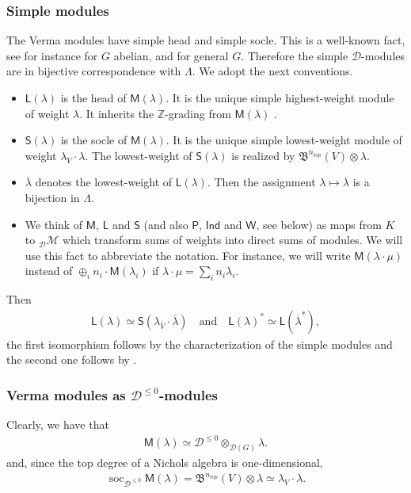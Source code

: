 \documentclass[reqno]{amsart}
\newcommand{\cM}{\mathcal{M}}
\newcommand{\oV}{\overline{V}}
\renewcommand{\_}[1]{_{\left( #1 \right)}}
\renewcommand{\^}[1]{^{\left( #1 \right)}}
\newcommand{\ot}{{\otimes}}
\newcommand\fInd{\mathsf{Ind}}
\newcommand\fL{\mathsf{L}}
\newcommand\fM{\mathsf{M}}
\newcommand\fP{\mathsf{P}}
\newcommand\fS{\mathsf{S}}
\newcommand\fW{\mathsf{W}}
\newcommand{\Z}{{\mathbb Z}}
\newcommand{\D}{\mathcal{D}}
\newcommand{\BV}{{\mathfrak B}}
\newcommand\soc{\operatorname{soc}_{\D^{\leq0}}}
\theoremstyle{plain}
\theoremstyle{definition}
\theoremstyle{remark}
\begin{document}
\subsubsection{Simple modules}\label{notation:L y S}
The Verma modules have simple head and simple socle. This is a well-known fact, see for instance \cite{MR3367089,MR2732981,MR2407847,MR2840165} for $G$ abelian, and \cite{MR2279242,MR2504492,PV2} for general $G$. Therefore the simple $\D$-modules are in bijective correspondence with $\Lambda$. We adopt the next conventions.
 
\begin{itemize}
 \item $\fL(\lambda)$ is the head of $\fM(\lambda)$. It is the unique simple highest-weight module of weight $\lambda$. It inherits the $\Z$-grading from $\fM(\lambda)$ \cite{PV2}.
 \smallskip
 \item $\fS(\lambda)$ is the socle of $\fM(\lambda)$. It is the unique simple lowest-weight module of weight $\lambda_V\cdot\lambda$. The lowest-weight of $\fS(\lambda)$ is realized by $\BV^{n_{top}}(V)\ot\lambda$.
 \smallskip
 \item $\overline{\lambda}$ denotes the lowest-weight of $\fL(\lambda)$. Then the assignment $\lambda\mapsto\overline{\lambda}$ is a bijection in $\Lambda$.
 \smallskip
 \item We think of $\fM$, $\fL$ and $\fS$ (and also $\fP$, $\fInd$ and $\fW$, see below) as maps from $K$ to ${}_{\D}\cM$ which transform sums of weights into  direct sums of modules. We will use this fact to abbreviate the notation. For instance, we will write $\fM(\lambda\cdot\mu)$ instead of $\oplus_in_i\cdot\fM(\lambda_i)$ if $\lambda\cdot\mu=\sum_in_i\lambda_i$.
\end{itemize}


Then
\begin{align}\label{eq:omga sobre L}
\fL(\lambda)\simeq\fS(\lambda_{\oV}\cdot\overline{\lambda})\quad\mbox{and}\quad\fL(\lambda)^*\simeq\fL\left(\overline{\lambda}^{*}\right),
\end{align}
the first isomorphism follows by the characterization of the simple modules and the second one follows by \cite[Theorem 5]{PV2}.

\subsubsection{Verma modules as $\D^{\leq0}$-modules}


Clearly, we have that
\begin{align}\label{eq:verma as Dleq0}
\fM(\lambda)\simeq\D^{\leq0}\ot_{\D(G)}\lambda.
\end{align}
and, since the top degree of a Nichols algebra is one-dimensional,
\begin{align}\label{eq:soc of Verma}
\soc\fM(\lambda)=\BV^{n_{top}}(V)\ot\lambda\simeq\lambda_V\cdot\lambda.
\end{align}
\end{document}
